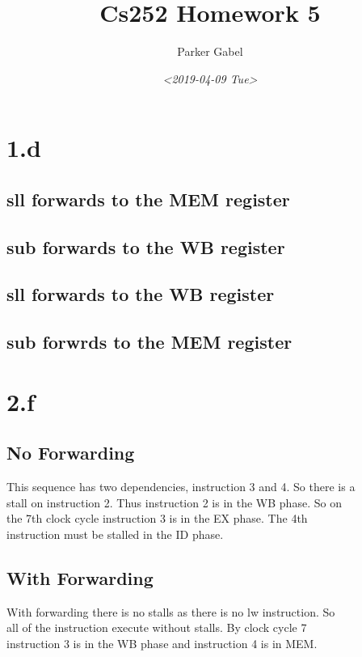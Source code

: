 \documentclass[11pt]{article}
\author{Parker Gabel}
\date{\textit{<2019-04-09 Tue>}}
\title{Cs252 Homework 5}
\begin{document}
\maketitle
\section{1.d}
\label{sec:org37f6dc8}
\subsection{sll forwards to the MEM register}
\label{sec:orgcb8461f}
\subsection{sub forwards to the WB register}
\label{sec:org05fe23d}
\subsection{sll forwards to the WB register}
\label{sec:orgcf1ce53}
\subsection{sub forwrds to the MEM register}
\label{sec:orgb9956c4}
\section{2.f}
\label{sec:org74d30e8}
\subsection{No Forwarding}
\label{sec:org331623b}
This sequence has two dependencies, instruction 3 and 4. So there is a\\
stall on instruction 2. Thus instruction 2 is in the WB phase. So on\\
the 7th clock cycle instruction 3 is in the EX phase. The 4th\\
instruction must be stalled in the ID phase.\\
\subsection{With Forwarding}
\label{sec:orgeab18ac}
With forwarding there is no stalls as there is no lw instruction. So\\
all of the instruction execute without stalls. By clock cycle 7\\
instruction 3 is in the WB phase and instruction 4 is in MEM.\\
\end{document}

